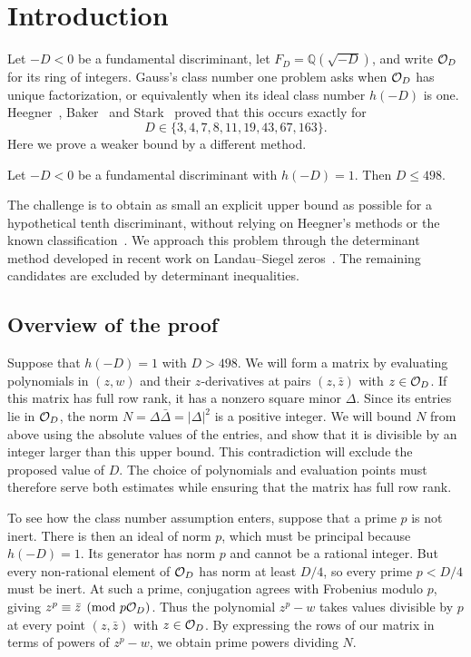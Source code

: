 \section{Introduction}\label{sec:intro}
Let $-D<0$ be a fundamental discriminant, let $F_D=\mathbb Q(\sqrt{-D})$,
and write $\mathcal O_D$ for its ring of integers. Gauss's class number one problem
asks when $\mathcal O_D$ has unique factorization, or equivalently when its ideal
class number $h(-D)$ is one. Heegner~\cite{heegner}, Baker~\cite{baker} and
Stark~\cite{stark} proved that this occurs exactly for
\begingroup
\abovedisplayskip=14pt
\belowdisplayskip=14pt
\abovedisplayshortskip=14pt
\belowdisplayshortskip=14pt
\[
 D\in\{3,4,7,8,11,19,43,67,163\}.
\]
\endgroup
Here we prove a weaker bound by a different method.

\begin{theorem}\label{thm:main}
Let $-D<0$ be a fundamental discriminant with $h(-D)=1$. Then $D\leq498$.
\end{theorem}

The challenge is to obtain as small an explicit upper bound as possible for
a hypothetical tenth discriminant, without relying on Heegner's methods or
the known classification~\cite{tao2026}. We approach this problem through the
determinant method developed in recent work on
Landau--Siegel zeros~\cite{green2026,taosketch}. The remaining candidates are excluded by determinant inequalities.

\subsection{Overview of the proof}\label{subsec:overview}
Suppose that $h(-D)=1$ with $D>498$. We will form a matrix by evaluating
polynomials in $(z,w)$ and their $z$-derivatives at pairs $(z,\bar z)$ with
$z\in\mathcal O_D$. If this
matrix has full row rank, it has a nonzero square minor $\Delta$. Since its
entries lie in $\mathcal O_D$, the norm $N=\Delta\bar\Delta=|\Delta|^2$ is a positive
integer. We will bound $N$ from above using the absolute values of the
entries, and show that it is divisible by an integer larger than this upper
bound. This contradiction will exclude the proposed value of $D$. The
choice of polynomials and evaluation points must therefore serve both
estimates while ensuring that the matrix has full row rank.

To see how the class number assumption enters, suppose that a prime $p$ is
not inert. There is then an ideal of norm $p$, which must be principal because
$h(-D)=1$. Its generator has norm $p$ and cannot be a rational integer. But
every non-rational element of $\mathcal O_D$ has norm at least $D/4$, so every prime
$p<D/4$ must be inert. At such a prime, conjugation agrees with Frobenius
modulo $p$, giving $z^p\equiv\bar z\pmod{p\mathcal O_D}$. Thus the polynomial
$z^p-w$ takes values divisible by $p$ at every point $(z,\bar z)$ with
$z\in\mathcal O_D$. By expressing the rows of our matrix in terms of powers of
$z^p-w$, we obtain prime powers dividing $N$.

